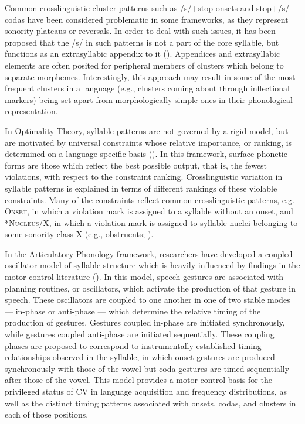   Common crosslinguistic cluster patterns such as /s/+stop onsets and stop+/s/ codas have been considered problematic in some frameworks, as they represent sonority plateaus or reversals. In order to deal with such issues, it has been proposed that the /s/ in such patterns is not a part of the core syllable, but functions as an extrasyllabic appendix to it (\citealt{VauxWolfe2009,Duanmu2011}). Appendices and extrasyllabic elements are often posited for peripheral members of clusters which belong to separate morphemes. Interestingly, this approach may result in some of the most frequent clusters in a language (e.g., clusters coming about through inflectional markers) being set apart from morphologically simple ones in their phonological representation.

  In Optimality Theory, syllable patterns are not governed by a rigid model, but are motivated by universal constraints whose relative importance, or ranking, is determined on a language-specific basis (\citealt{PrinceSmolensky1993}). In this framework, surface phonetic forms are those which reflect the best possible output, that is, the fewest violations, with respect to the constraint ranking. Crosslinguistic variation in syllable patterns is explained in terms of different rankings of these violable constraints. Many of the constraints reflect common crosslinguistic patterns, e.g. \textsc{Onset}, in which a violation mark is assigned to a syllable without an onset, and *\textsc{Nucleus}/X, in which a violation mark is assigned to syllable nuclei belonging to some sonority class X (e.g., obstruents; \citealt{McCarthy2008}).

  In the Articulatory Phonology framework, researchers have developed a coupled oscillator model of syllable structure which is heavily influenced by findings in the motor control literature (\citealt{NamSaltzman2003,GoldsteinEtAl2006,NamEtAl2009}). In this model, speech gestures are associated with planning routines, or oscillators, which activate the production of that gesture in speech. These oscillators are coupled to one another in one of two stable modes — in-phase or anti-phase — which determine the relative timing of the production of gestures. Gestures coupled in-phase are initiated synchronously, while gestures coupled anti-phase are initiated sequentially. These coupling phases are proposed to correspond to instrumentally established timing relationships observed in the syllable, in which onset gestures are produced synchronously with those of the vowel but coda gestures are timed sequentially after those of the vowel. This model provides a motor control basis for the privileged status of CV in language acquisition and frequency distributions, as well as the distinct timing patterns associated with onsets, codas, and clusters in each of those positions.

